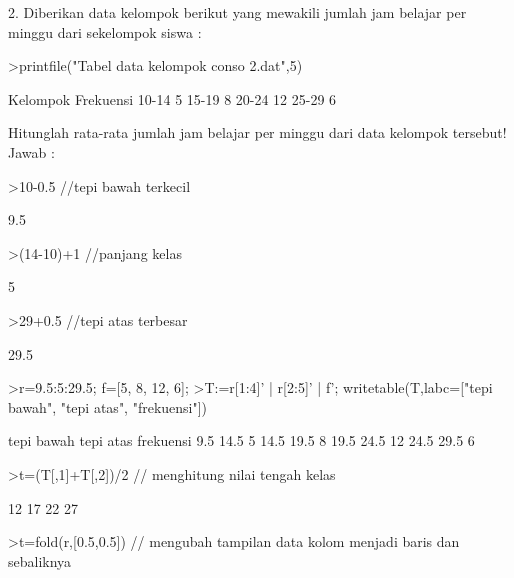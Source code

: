 \documentclass[a4paper,10pt]{article}
\begin{document}
\begin{eulernotebook}
\begin{eulercomment}
\begin{eulercomment}
\begin{eulercomment}
\begin{eulercomment}
\begin{eulercomment}
\begin{eulercomment}
\begin{eulercomment}
\begin{eulercomment}
\begin{eulercomment}
\begin{eulercomment}
\begin{eulercomment}
\begin{eulercomment}
\begin{eulercomment}
2. Diberikan data kelompok berikut yang mewakili jumlah jam belajar
per minggu dari sekelompok siswa :
\end{eulercomment}
\begin{eulerprompt}
>printfile("Tabel data kelompok conso 2.dat",5)
\end{eulerprompt}
\begin{euleroutput}
      Kelompok        Frekuensi
       10-14              5
       15-19              8
       20-24              12
       25-29              6
\end{euleroutput}
\begin{eulercomment}
Hitunglah rata-rata jumlah jam belajar per minggu dari data kelompok
tersebut!\\
Jawab :
\end{eulercomment}
\begin{eulerprompt}
>10-0.5  //tepi bawah terkecil
\end{eulerprompt}
\begin{euleroutput}
  9.5
\end{euleroutput}
\begin{eulerprompt}
>(14-10)+1  //panjang kelas
\end{eulerprompt}
\begin{euleroutput}
  5
\end{euleroutput}
\begin{eulerprompt}
>29+0.5  //tepi atas terbesar
\end{eulerprompt}
\begin{euleroutput}
  29.5
\end{euleroutput}
\begin{eulerprompt}
>r=9.5:5:29.5; f=[5, 8, 12, 6];
>T:=r[1:4]' | r[2:5]' | f'; writetable(T,labc=["tepi bawah", "tepi atas", "frekuensi"])
\end{eulerprompt}
\begin{euleroutput}
   tepi bawah tepi atas frekuensi
          9.5      14.5         5
         14.5      19.5         8
         19.5      24.5        12
         24.5      29.5         6
\end{euleroutput}
\begin{eulerprompt}
>t=(T[,1]+T[,2])/2  // menghitung nilai tengah kelas
\end{eulerprompt}
\begin{euleroutput}
             12 
             17 
             22 
             27 
\end{euleroutput}
\begin{eulerprompt}
>t=fold(r,[0.5,0.5]) // mengubah tampilan data kolom menjadi baris dan sebaliknya

\end{eulerprompt}
\end{eulercomment}
\end{eulercomment}
\end{eulercomment}
\end{eulercomment}
\end{eulercomment}
\end{eulercomment}
\end{eulercomment}
\end{eulercomment}
\end{eulercomment}
\end{eulercomment}
\end{eulercomment}
\end{eulercomment}
\end{eulernotebook}
\end{document}
